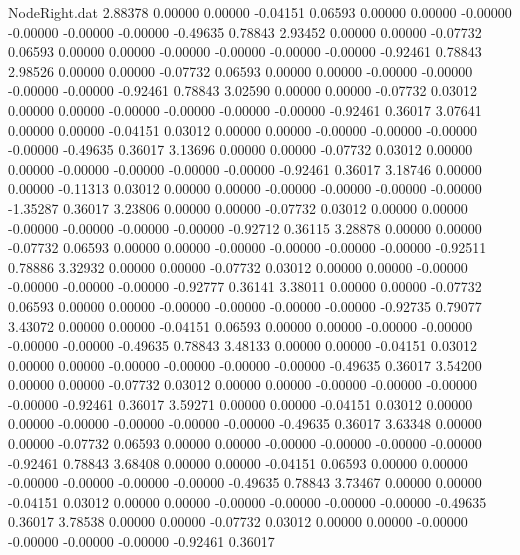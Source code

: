 \begin{filecontents}{NodeRight.dat}
   2.88378    0.00000    0.00000    -0.04151    0.06593    0.00000    0.00000   -0.00000   -0.00000   -0.00000   -0.00000   -0.49635    0.78843
   2.93452    0.00000    0.00000    -0.07732    0.06593    0.00000    0.00000   -0.00000   -0.00000   -0.00000   -0.00000   -0.92461    0.78843
   2.98526    0.00000    0.00000    -0.07732    0.06593    0.00000    0.00000   -0.00000   -0.00000   -0.00000   -0.00000   -0.92461    0.78843
   3.02590    0.00000    0.00000    -0.07732    0.03012    0.00000    0.00000   -0.00000   -0.00000   -0.00000   -0.00000   -0.92461    0.36017
   3.07641    0.00000    0.00000    -0.04151    0.03012    0.00000    0.00000   -0.00000   -0.00000   -0.00000   -0.00000   -0.49635    0.36017
   3.13696    0.00000    0.00000    -0.07732    0.03012    0.00000    0.00000   -0.00000   -0.00000   -0.00000   -0.00000   -0.92461    0.36017
   3.18746    0.00000    0.00000    -0.11313    0.03012    0.00000    0.00000   -0.00000   -0.00000   -0.00000   -0.00000   -1.35287    0.36017
   3.23806    0.00000    0.00000    -0.07732    0.03012    0.00000    0.00000   -0.00000   -0.00000   -0.00000   -0.00000   -0.92712    0.36115
   3.28878    0.00000    0.00000    -0.07732    0.06593    0.00000    0.00000   -0.00000   -0.00000   -0.00000   -0.00000   -0.92511    0.78886
   3.32932    0.00000    0.00000    -0.07732    0.03012    0.00000    0.00000   -0.00000   -0.00000   -0.00000   -0.00000   -0.92777    0.36141
   3.38011    0.00000    0.00000    -0.07732    0.06593    0.00000    0.00000   -0.00000   -0.00000   -0.00000   -0.00000   -0.92735    0.79077
   3.43072    0.00000    0.00000    -0.04151    0.06593    0.00000    0.00000   -0.00000   -0.00000   -0.00000   -0.00000   -0.49635    0.78843
   3.48133    0.00000    0.00000    -0.04151    0.03012    0.00000    0.00000   -0.00000   -0.00000   -0.00000   -0.00000   -0.49635    0.36017
   3.54200    0.00000    0.00000    -0.07732    0.03012    0.00000    0.00000   -0.00000   -0.00000   -0.00000   -0.00000   -0.92461    0.36017
   3.59271    0.00000    0.00000    -0.04151    0.03012    0.00000    0.00000   -0.00000   -0.00000   -0.00000   -0.00000   -0.49635    0.36017
   3.63348    0.00000    0.00000    -0.07732    0.06593    0.00000    0.00000   -0.00000   -0.00000   -0.00000   -0.00000   -0.92461    0.78843
   3.68408    0.00000    0.00000    -0.04151    0.06593    0.00000    0.00000   -0.00000   -0.00000   -0.00000   -0.00000   -0.49635    0.78843
   3.73467    0.00000    0.00000    -0.04151    0.03012    0.00000    0.00000   -0.00000   -0.00000   -0.00000   -0.00000   -0.49635    0.36017
   3.78538    0.00000    0.00000    -0.07732    0.03012    0.00000    0.00000   -0.00000   -0.00000   -0.00000   -0.00000   -0.92461    0.36017

\end{filecontents}

